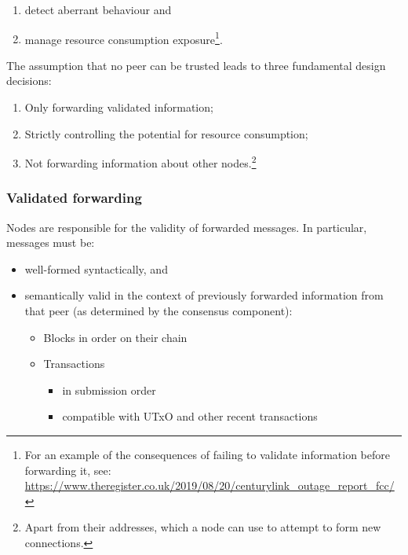 \documentclass[11pt,a4paper]{article}
\begin{document}
\begin{enumerate}
\item
  detect aberrant behaviour and
\item
  manage resource consumption exposure\footnote{For an example of the
    consequences of failing to validate information before forwarding
    it, see:
    \href{https://www.theregister.co.uk/2019/08/20/centurylink_outage_report_fcc/}{{https://www.theregister.co.uk/2019/08/20/centurylink\_outage\_report\_fcc/}}}.
\end{enumerate}

The assumption that no peer can be trusted leads to three fundamental
design decisions:

\begin{enumerate}
\item
  Only forwarding validated information;
\item
  Strictly controlling the potential for resource consumption;
\item
  Not forwarding information about other nodes.\footnote{Apart from
    their addresses, which a node can use to attempt to form new
    connections.}
\end{enumerate}

\subsubsection{Validated forwarding}
\label{validated-forwarding}

Nodes are responsible for the validity of forwarded messages. In
particular, messages must be:

\begin{itemize}
\item
  well-formed syntactically, and
\item
  semantically valid in the context of previously forwarded information
  from that peer (as determined by the consensus component):

  \begin{itemize}
  \item
    Blocks in order on their chain
  \item
    Transactions

    \begin{itemize}
    \item
      in submission order
    \item
      compatible with UTxO and other recent transactions
    \end{itemize}
  \end{itemize}
\end{itemize}
\end{document}
